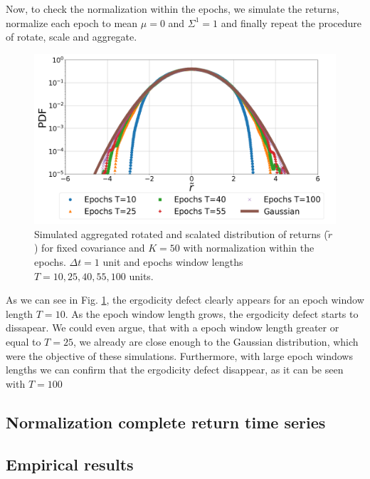 Now, to check the normalization within the epochs, we simulate the returns,
normalize each epoch to mean $\mu = 0$ and $\Sigma^{1} = 1$ and finally repeat
the procedure of rotate, scale and aggregate.

\begin{figure}[htbp]
    \centering
    \includegraphics[width=0.6\columnwidth]
    {figures/06_epochs_sim_agg_ret_pairs_norm.png}
    \caption{Simulated aggregated rotated and scalated distribution of returns
             ($\tilde{r}$) for fixed covariance and $K=50$ with normalization
             within the epochs. $\Delta t = 1$ unit and epochs window  lengths
             $T=10, 25, 40, 55, 100$ units.}
    \label{fig:epochs_agg_ret_pairs_norm}
\end{figure}

As we can see in Fig. \ref{fig:epochs_agg_ret_pairs_norm}, the ergodicity
defect clearly appears for an epoch window length $T = 10$. As the epoch window
length grows, the ergodicity defect starts to dissapear. We could even argue,
that with a epoch window length greater or equal to $T = 25$, we already are
close enough to the Gaussian distribution, which were the objective of these
simulations. Furthermore, with large epoch windows lengths we can confirm that
the ergodicity defect disappear, as it can be seen with $T = 100$

\subsection{Normalization complete return time series}
\label{subsec:norm_full_sim}

\subsection{Empirical results}
\label{subsec:emp_results}